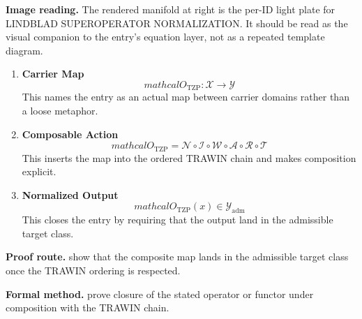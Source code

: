 \begin{samepage}
\noindent\begin{minipage}[t]{0.45\linewidth}
\vspace{0pt}
\raggedright
\scriptsize\textbf{Image reading.} The rendered manifold at right is the per-ID light plate for LINDBLAD SUPEROPERATOR NORMALIZATION. It should be read as the visual companion to the entry's equation layer, not as a repeated template diagram.\par
\end{minipage}\hfill
\begin{minipage}[t]{0.53\linewidth}
\vspace*{-0.10in}
\raggedright
{}
\end{minipage}
\end{samepage}

\clearpage


\begin{enumerate}[leftmargin=1.6em,itemsep=9pt,topsep=6pt]
\item \textbf{Carrier Map}
\[
mathcal{O}_{\mathrm{TZP}} : \mathcal{X} \to \mathcal{Y}
\]
This names the entry as an actual map between carrier domains rather than a loose metaphor.

\item \textbf{Composable Action}
\[
mathcal{O}_{\mathrm{TZP}} = \mathcal{N}\circ \mathcal{I}\circ \mathcal{W}\circ \mathcal{A}\circ \mathcal{R}\circ \mathcal{T}
\]
This inserts the map into the ordered TRAWIN chain and makes composition explicit.

\item \textbf{Normalized Output}
\[
mathcal{O}_{\mathrm{TZP}}(x) \in \mathcal{Y}_{\mathrm{adm}}
\]
This closes the entry by requiring that the output land in the admissible target class.
\end{enumerate}

\textbf{Proof route.} show that the composite map lands in the admissible target class once the TRAWIN ordering is respected.

\textbf{Formal method.} prove closure of the stated operator or functor under composition with the TRAWIN chain.

\medskip
{}

